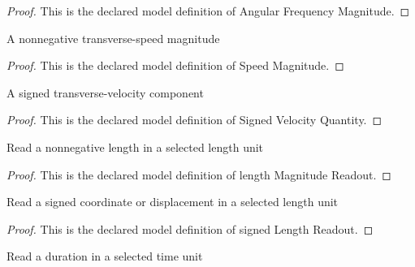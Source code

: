 \begin{proof}
  This is the declared model definition of Angular Frequency Magnitude.
\end{proof}
\begin{definition}
  \label{def:physics:phyx-mini-0305:phyxminiproblems-problemphyxmini0305-speedmagnitude}
  A nonnegative transverse-speed magnitude
\end{definition}
\begin{proof}
  This is the declared model definition of Speed Magnitude.
\end{proof}
\begin{definition}
  \label{def:physics:phyx-mini-0305:phyxminiproblems-problemphyxmini0305-signedvelocityquantity}
  A signed transverse-velocity component
\end{definition}
\begin{proof}
  This is the declared model definition of Signed Velocity Quantity.
\end{proof}
\begin{definition}
  \label{def:physics:phyx-mini-0305:phyxminiproblems-problemphyxmini0305-lengthmagnitudereadout}
  Read a nonnegative length in a selected length unit
\end{definition}
\begin{proof}
  This is the declared model definition of length Magnitude Readout.
\end{proof}
\begin{definition}
  \label{def:physics:phyx-mini-0305:phyxminiproblems-problemphyxmini0305-signedlengthreadout}
  Read a signed coordinate or displacement in a selected length unit
\end{definition}
\begin{proof}
  This is the declared model definition of signed Length Readout.
\end{proof}
\begin{definition}
  \label{def:physics:phyx-mini-0305:phyxminiproblems-problemphyxmini0305-durationreadout}
  Read a duration in a selected time unit
\end{definition}
